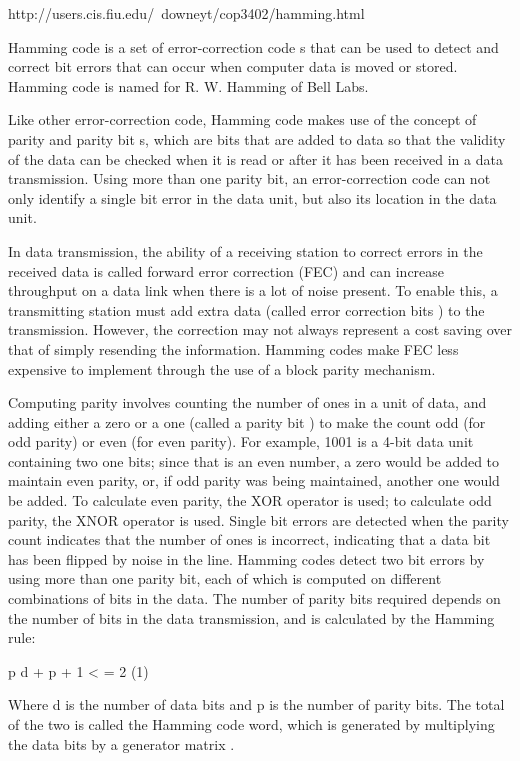 http://users.cis.fiu.edu/~downeyt/cop3402/hamming.html


Hamming code is a set of error-correction code s that can be used to detect and correct bit errors that can occur when computer data is moved or stored. Hamming code is named for R. W. Hamming of Bell Labs.

Like other error-correction code, Hamming code makes use of the concept of parity and parity bit s, which are bits that are added to data so that the validity of the data can be checked when it is read or after it has been received in a data transmission. Using more than one parity bit, an error-correction code can not only identify a single bit error in the data unit, but also its location in the data unit.

In data transmission, the ability of a receiving station to correct errors in the received data is called forward error correction (FEC) and can increase throughput on a data link when there is a lot of noise present. To enable this, a transmitting station must add extra data (called error correction bits ) to the transmission. However, the correction may not always represent a cost saving over that of simply resending the information. Hamming codes make FEC less expensive to implement through the use of a block parity mechanism.

Computing parity involves counting the number of ones in a unit of data, and adding either a zero or a one (called a parity bit ) to make the count odd (for odd parity) or even (for even parity). For example, 1001 is a 4-bit data unit containing two one bits; since that is an even number, a zero would be added to maintain even parity, or, if odd parity was being maintained, another one would be added. To calculate even parity, the XOR operator is used; to calculate odd parity, the XNOR operator is used. Single bit errors are detected when the parity count indicates that the number of ones is incorrect, indicating that a data bit has been flipped by noise in the line. Hamming codes detect two bit errors by using more than one parity bit, each of which is computed on different combinations of bits in the data. The number of parity bits required depends on the number of bits in the data transmission, and is calculated by the Hamming rule:

p
d + p + 1 < = 2 (1)

Where d is the number of data bits and p is the number of parity bits. The total of the two is called the Hamming code word, which is generated by multiplying the data bits by a generator matrix .

